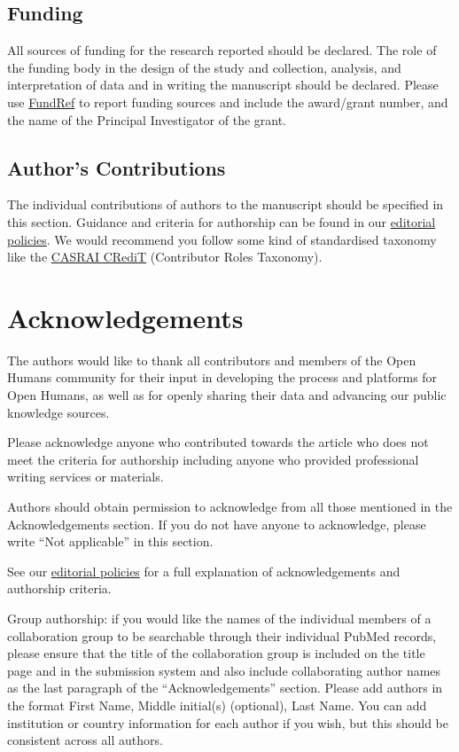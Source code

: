 \documentclass[a4paper,num-refs]{oup-contemporary}
\begin{document}
\subsection{Funding}

All sources of funding for the research reported should be declared. The role of the funding body in the design of the study and collection, analysis, and interpretation of data and in writing the manuscript should be declared. Please use \href{http://www.crossref.org/fundingdata/}{FundRef} to report funding sources and include the award/grant number, and the name of the Principal Investigator of the grant. 


\subsection{Author's Contributions}

The individual contributions of authors to the manuscript should be specified in this section. Guidance and criteria for authorship can be found in our \href{https://academic.oup.com/gigascience/pages/editorial_policies_and_reporting_standards}{editorial policies}. We would recommend you follow some kind of standardised taxonomy like the \href{http://docs.casrai.org/CRediT}{CASRAI CRediT} (Contributor Roles Taxonomy).


\section{Acknowledgements}
The authors would like to thank all contributors and members of the Open Humans community for their input in developing the process and platforms for Open Humans, as well as for openly sharing their data and advancing our public knowledge sources.

Please acknowledge anyone who contributed towards the article who does not meet the criteria for authorship including anyone who provided professional writing services or materials.

Authors should obtain permission to acknowledge from all those mentioned in the Acknowledgements section. If you do not have anyone to acknowledge, please write ``Not applicable'' in this section.

See our \href{https://academic.oup.com/gigascience/pages/editorial_policies_and_reporting_standards}{editorial policies} for a full explanation of acknowledgements and authorship criteria.

Group authorship: if you would like the names of the individual members of a collaboration group to be searchable through their individual PubMed records, please ensure that the title of the collaboration group is included on the title page and in the submission system and also include collaborating author names as the last paragraph of the “Acknowledgements” section. Please add authors in the format First Name, Middle initial(s) (optional), Last Name. You can add institution or country information for each author if you wish, but this should be consistent across all authors.
\end{document}
